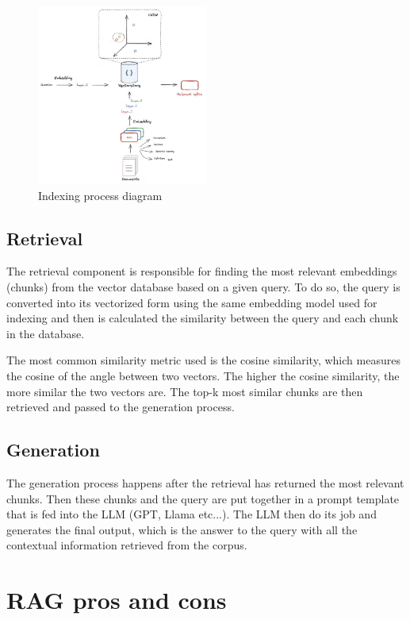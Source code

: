 \documentclass[conference]{IEEEtran}
\begin{document}
\begin{figure}[htbp!]
    \centerline{\includegraphics[width=0.5\textwidth]{images/indexing_diagram.jpg}}
    \caption{Indexing process diagram \cite{bavli_rag_2024}}
    \label{fig:indexing_diagram}
\end{figure}

\subsection{Retrieval}
The retrieval component is responsible for finding the most relevant embeddings (chunks) from the vector database
based on a given query. To do so, the query is converted into its vectorized form using
the same embedding model used for indexing and then is calculated the similarity between the query and each chunk in the database.

The most common similarity metric used is the cosine similarity, which measures the cosine of the angle between two vectors.
The higher the cosine similarity, the more similar the two vectors are.
The top-k most similar chunks are then retrieved and passed to the generation process.

\subsection{Generation}
The generation process happens after the retrieval has returned the most relevant chunks.
Then these chunks and the query are put together in a prompt template that is fed into the LLM (GPT, Llama etc...).
The LLM then do its job and generates the final output, which is the answer to the query with all the
contextual information retrieved from the corpus.

\section{RAG pros and cons}
\end{document}
